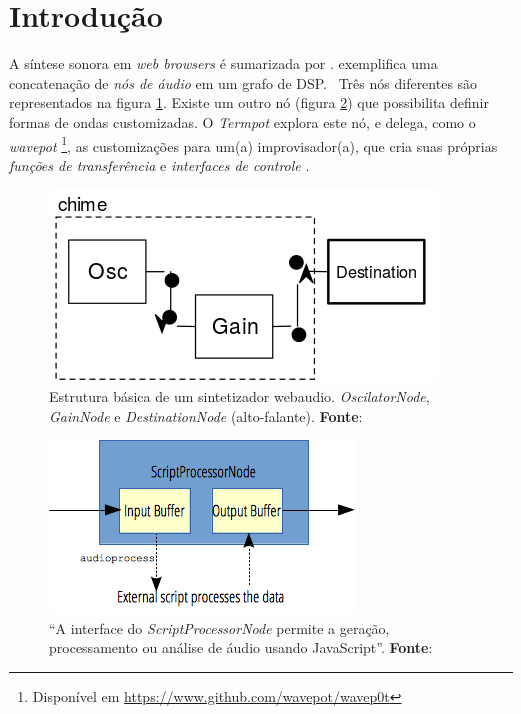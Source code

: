 \section{Introdução}\label{sec:introducao}




A síntese sonora em \emph{web browsers} é sumarizada por \cite{w3c_web_2012,roberts_web_2013-,wyse_viability_2014}.\cite{srikumar_tamming_2013} exemplifica uma concatenação de \emph{nós de áudio} em um grafo de DSP. \ Três nós diferentes são representados na figura \ref{fig:chime}. Existe um outro nó (figura \ref{fig:scriptprocessor}) que possibilita definir formas de ondas customizadas. O \emph{Termpot} explora este nó, e delega, como o \emph{wavepot} \footnote{Disponível em \url{https://www.github.com/wavepot/wavep0t}}, as customizações para um(a) improvisador(a), que cria suas próprias \emph{funções de transferência} e \emph{interfaces de controle} \cite{mathews_groove_1970}.

\begin{figure}[!h]
\centering
\includegraphics[scale=0.3]{chime.png}
\caption{Estrutura básica de um sintetizador webaudio. \emph{OscilatorNode}, \emph{GainNode} e \emph{DestinationNode} (alto-falante). \textbf{Fonte}: \cite{srikumar_tamming_2013}}
\label{fig:chime}  
\end{figure}


\begin{figure}[!h]
\centering
\includegraphics[scale=0.6]{WebAudioScriptProcessingNode.png}
\caption{``A interface do \emph{ScriptProcessorNode} permite a geração, processamento ou análise de áudio usando JavaScript''. \textbf{Fonte}: \cite{w3c_web_2012}}
\label{fig:scriptprocessor} 
\end{figure}


